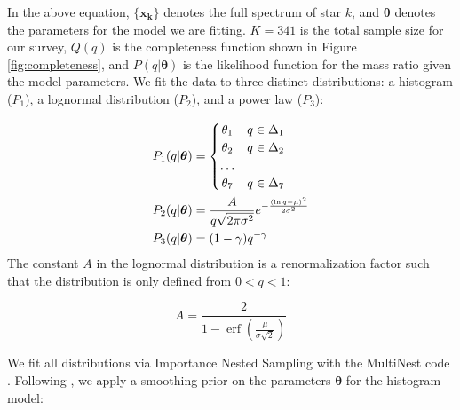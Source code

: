 \documentclass{emulateapj}
\renewcommand{\vec}[1]{\bm{#1}}
\DeclareMathOperator\erf{erf}
\begin{document}
In the above equation, $\{\vec{x_k}\}$ denotes the full spectrum of star $k$, and $\vec{\theta}$ denotes the parameters for the model we are fitting. $K=341$ is the total sample size for our survey, $Q(q)$ is the completeness function shown in Figure \ref{fig:completeness}, and $P(q|\vec{\theta})$ is the likelihood function for the mass ratio given the model parameters. We fit the data to three distinct distributions: a histogram ($P_1$), a lognormal distribution ($P_2$), and a power law ($P_3$):

\begin{align}
 P_1(q|\vec{\theta}) &= \begin{cases}
      \hfill \theta_1 \hfill & q \in \Delta_1 \\
      \hfill \theta_2 \hfill & q \in \Delta_2 \\
      \hfill \ldots \\
      \hfill \theta_7 \hfill & q \in \Delta_7
     \end{cases} \label{eqn:P1} \\
 P_2(q|\vec{\theta}) &= \frac{A}{q\sqrt{2\pi\sigma^2}} e^{-\frac{(\ln{q} - \mu)^2}{2\sigma^2}} \label{eqn:P2} \\
 P_3(q|\vec{\theta}) &= (1-\gamma)q^{-\gamma} \label{eqn:P3}
\end{align}
The constant $A$ in the lognormal distribution is a renormalization factor such that the distribution is only defined from $0 < q < 1$:

\begin{equation}
A = \frac{2}{1-\erf\left(\frac{\mu}{\sigma \sqrt{2}}\right)}
\end{equation}

We fit all distributions via Importance Nested Sampling with the MultiNest code \citep{multinest}. Following \citet{Foreman2014}, we apply a smoothing prior on the parameters $\vec{\theta}$ for the histogram model:
\end{document}
